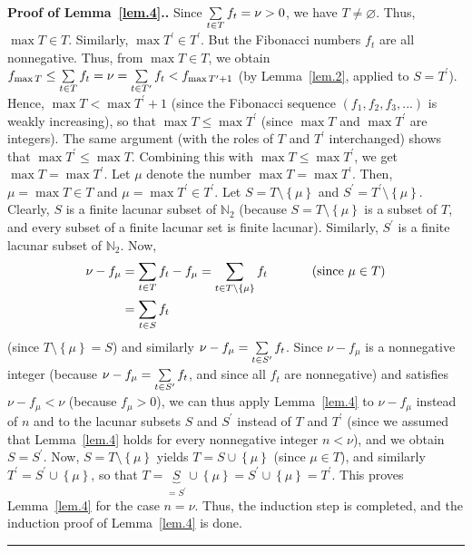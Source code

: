\documentclass[numbers=enddot,12pt,final,onecolumn,notitlepage]{scrartcl}%
\numberwithin{exer}{section}
\theoremstyle{definition}
\newenvironment{proof}[1][Proof]{\noindent\textbf{#1.} }{\ \rule{0.5em}{0.5em}}
\let\sumnonlimits\sum
\renewcommand{\sum}{\sumnonlimits\limits}
\begin{document}
\begin{proof}[Proof of Lemma~\ref{lem.4}.]
Since $\sum\limits_{t\in T}f_{t}=\nu>0$, we have $T\neq\varnothing$. Thus,
$\max T\in T$. Similarly, $\max T^{\prime}\in T^{\prime}$. But the Fibonacci
numbers $f_{t}$ are all nonnegative. Thus, from $\max T \in T$, we obtain
$f_{\max T}\leq\sum\limits_{t\in T}f_{t}=\nu=\sum\limits_{t\in T^{\prime}%
}f_{t}<f_{\max T^{\prime}+1}$ (by Lemma~\ref{lem.2}, applied to $S=T^{\prime}$). Hence,
$\max T<\max T^{\prime}+1$ (since the Fibonacci sequence $\left(  f_{1}%
,f_{2},f_{3},...\right)  $ is weakly increasing), so that $\max T\leq\max
T^{\prime}$ (since $\max T$ and $\max T^{\prime}$ are integers). The same
argument (with the roles of $T$ and $T^{\prime}$ interchanged) shows that
$\max T^{\prime}\leq\max T$. Combining this with $\max T\leq\max T^{\prime}$,
we get $\max T=\max T^{\prime}$. Let $\mu$ denote the number $\max T=\max
T^{\prime}$. Then, $\mu=\max T\in T$ and $\mu=\max T^{\prime}\in T^{\prime}$.
Let $S=T\setminus\left\{  \mu\right\}  $ and $S^{\prime}=T^{\prime}%
\setminus\left\{  \mu\right\}  $. Clearly, $S$ is a finite lacunar subset of
$\mathbb{N}_{2}$ (because $S=T\setminus\left\{  \mu\right\}  $ is a subset of
$T$, and every subset of a finite lacunar set is finite lacunar). Similarly,
$S^{\prime}$ is a finite lacunar subset of $\mathbb{N}_{2}$. Now,%
\begin{align*}
\nu-f_{\mu}  &  =\sum\limits_{t\in T}f_{t}-f_{\mu}=\sum\limits_{t\in
T\setminus\left\{  \mu\right\}  }f_{t}\ \ \ \ \ \ \ \ \ \ \left(  \text{since
}\mu\in T\right) \\
&  =\sum\limits_{t\in S}f_{t}%
\end{align*}
(since $T\setminus\left\{  \mu\right\}  =S$) and similarly $\nu-f_{\mu}%
=\sum\limits_{t\in S^{\prime}}f_{t}$. Since $\nu-f_{\mu}$ is a nonnegative
integer (because $\nu-f_{\mu}=\sum\limits_{t\in S^{\prime}}f_{t}$, and since
all $f_{t}$ are nonnegative) and satisfies $\nu-f_{\mu}<\nu$ (because $f_{\mu
}> 0$), we can thus apply Lemma~\ref{lem.4} to $\nu-f_{\mu}$ instead of $n$ and to the
lacunar subsets $S$ and $S^{\prime}$ instead of $T$ and $T^{\prime}$ (since we
assumed that Lemma~\ref{lem.4} holds for every nonnegative integer $n<\nu$), and we
obtain $S=S^{\prime}$. Now, $S=T\setminus\left\{  \mu\right\}  $ yields
$T=S\cup\left\{  \mu\right\}  $ (since $\mu\in T$), and similarly $T^{\prime
}=S^{\prime}\cup\left\{  \mu\right\}  $, so that $T=\underbrace{S}%
_{=S^{\prime}}\cup\left\{  \mu\right\}  =S^{\prime}\cup\left\{  \mu\right\}
=T^{\prime}$. This proves Lemma~\ref{lem.4} for the case $n=\nu$. Thus, the induction
step is completed, and the induction proof of Lemma~\ref{lem.4} is done.
\end{proof}
\end{document}
